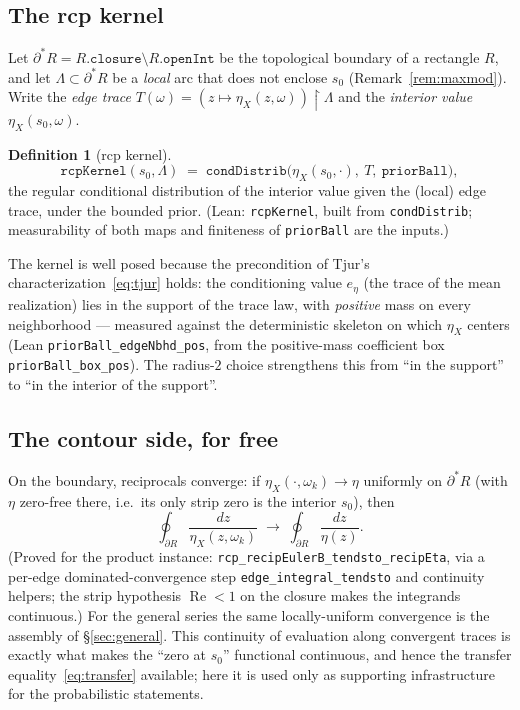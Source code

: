 \documentclass[11pt,a4paper]{article}
\theoremstyle{definition}
\newtheorem{definition}[theorem]{Definition}
\newcommand{\Rea}{\operatorname{Re}}
\newcommand{\etaX}{\eta_X}
\begin{document}
\subsection{The rcp kernel}\label{sec:kernel}

Let \(\partial^\ast R = R.\texttt{closure}\setminus R.\texttt{openInt}\) be the topological
boundary of a rectangle \(R\), and let \(\Lambda\subset\partial^\ast R\) be a \emph{local}
arc that does not enclose \(s_0\) (Remark~\ref{rem:maxmod}). Write the \emph{edge trace}
\(T(\omega) = (z\mapsto \etaX(z,\omega))\restriction \Lambda\) and the \emph{interior
value} \(\etaX(s_0,\omega)\).

\begin{definition}[rcp kernel]\label{def:kernel}
\[
  \texttt{rcpKernel}(s_0,\Lambda)
  \;=\; \texttt{condDistrib}\bigl(\etaX(s_0,\cdot),\ T,\ \texttt{priorBall}\bigr),
\]
the regular conditional distribution of the interior value given the (local) edge trace,
under the bounded prior. (Lean: \texttt{rcpKernel}, built from \texttt{condDistrib};
measurability of both maps and finiteness of \texttt{priorBall} are the inputs.)
\end{definition}

The kernel is well posed because the precondition of Tjur's
characterization~\eqref{eq:tjur} holds: the conditioning value \(e_\eta\) (the trace of the
mean realization) lies in the support of the trace law, with \emph{positive} mass on every
neighborhood --- measured against the deterministic skeleton on which \(\etaX\) centers
(Lean \texttt{priorBall\_edgeNbhd\_pos}, from the positive-mass coefficient box
\texttt{priorBall\_box\_pos}). The radius-\(2\) choice strengthens this from ``in the
support'' to ``in the interior of the support''.

\subsection{The contour side, for free}

On the boundary, reciprocals converge: if \(\etaX(\cdot,\omega_k)\to\eta\) uniformly on
\(\partial^\ast R\) (with \(\eta\) zero-free there, i.e.\ its only strip zero is the
interior \(s_0\)), then
\[
  \oint_{\partial R}\frac{dz}{\etaX(z,\omega_k)}
  \;\longrightarrow\;
  \oint_{\partial R}\frac{dz}{\eta(z)} .
\]
(Proved for the product instance: \texttt{rcp\_recipEulerB\_tendsto\_recipEta}, via a
per-edge dominated-convergence step \texttt{edge\_integral\_tendsto} and continuity
helpers; the strip hypothesis \(\Rea<1\) on the closure makes the integrands continuous.)
For the general series the same locally-uniform convergence is the assembly of
\S\ref{sec:general}. This continuity of evaluation along convergent traces is exactly what
makes the ``zero at \(s_0\)'' functional continuous, and hence the transfer
equality~\eqref{eq:transfer} available; here it is used only as supporting infrastructure
for the probabilistic statements.
\end{document}
